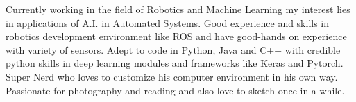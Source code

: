 

\begin{cvparagraph}

Currently working in the field of Robotics and Machine Learning my interest lies in applications of A.I. in Automated Systems. Good experience and skills in robotics development environment like ROS and have good-hands on experience with variety of sensors. Adept to code in Python, Java and C++ with credible python skills in deep learning modules and frameworks like Keras and Pytorch. Super Nerd who loves to customize his computer environment in his own way. Passionate for photography and reading and also love to sketch once in a while.
\end{cvparagraph}

